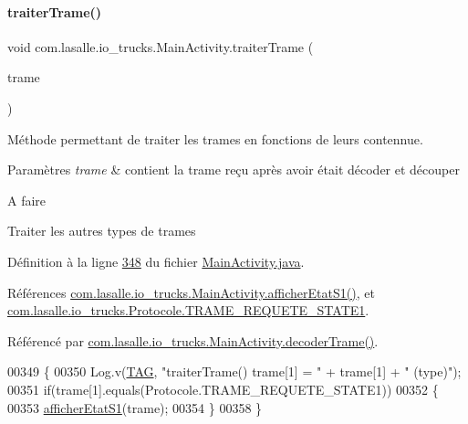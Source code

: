 \paragraph{\texorpdfstring{traiter\+Trame()}{traiterTrame()}}
{\footnotesize\ttfamily void com.\+lasalle.\+io\+\_\+trucks.\+Main\+Activity.\+traiter\+Trame (\begin{DoxyParamCaption}\item[{String \mbox{[}$\,$\mbox{]}}]{trame }\end{DoxyParamCaption})\hspace{0.3cm}{\ttfamily [private]}}



Méthode permettant de traiter les trames en fonctions de leurs contennue. 


\begin{DoxyParams}{Paramètres}
{\em trame} & contient la trame reçu après avoir était décoder et découper \\
\hline
\end{DoxyParams}
\begin{DoxyRefDesc}{A faire}
\item[\hyperlink{todo__todo000001}{A faire}]Traiter les autres types de trames \end{DoxyRefDesc}


Définition à la ligne \hyperlink{_main_activity_8java_source_l00348}{348} du fichier \hyperlink{_main_activity_8java_source}{Main\+Activity.\+java}.



Références \hyperlink{_main_activity_8java_source_l00360}{com.\+lasalle.\+io\+\_\+trucks.\+Main\+Activity.\+afficher\+Etat\+S1()}, et \hyperlink{_protocole_8java_source_l00025}{com.\+lasalle.\+io\+\_\+trucks.\+Protocole.\+T\+R\+A\+M\+E\+\_\+\+R\+E\+Q\+U\+E\+T\+E\+\_\+\+S\+T\+A\+T\+E1}.



Référencé par \hyperlink{_main_activity_8java_source_l00325}{com.\+lasalle.\+io\+\_\+trucks.\+Main\+Activity.\+decoder\+Trame()}.


\begin{DoxyCode}
00349     \{
00350         Log.v(\hyperlink{classcom_1_1lasalle_1_1io__trucks_1_1_main_activity_a37b90dba972711328e3f4c83c55eb0fc}{TAG}, \textcolor{stringliteral}{"traiterTrame() trame[1] = "} + trame[1] + \textcolor{stringliteral}{" (type)"});
00351         \textcolor{keywordflow}{if}(trame[1].equals(Protocole.TRAME\_REQUETE\_STATE1))
00352         \{
00353             \hyperlink{classcom_1_1lasalle_1_1io__trucks_1_1_main_activity_ac820f476b430c74a1201d9a906fd8429}{afficherEtatS1}(trame);
00354         \}
00358     \}
\end{DoxyCode}


